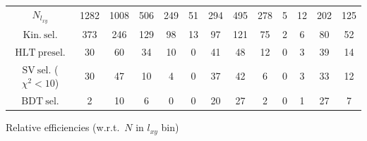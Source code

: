 \documentclass[10pt,a4paper]{article}
\begin{document}
\begin{landscape}
{\begin{tabular}{c|cccc|cccc|cccc}
\midrule
$N_{l_{xy}}$ & 1282 & 1008 & 506 & 249 & 51 & 294 & 495 & 278 & 5 & 12 & 202 & 125\\
$\mathrm{Kin.\ sel.}$ & 373 & 246 & 129 & 98 & 13 & 97 & 121 & 75 & 2 & 6 & 80 & 52\\
$\mathrm{HLT\ presel.}$ & 30 & 60 & 34 & 10 & 0 & 41 & 48 & 12 & 0 & 3 & 39 & 14\\
$\mathrm{SV\ sel.}$ ($\chi^2{<}10$) & 30 & 47 & 10 & 4 & 0 & 37 & 42 & 6 & 0 & 3 & 33 & 12\\
$\mathrm{BDT\ sel.}$ & 2 & 10 & 6 & 0 & 0 & 20 & 27 & 2 & 0 & 1 & 27 & 7\\
\bottomrule
\end{tabular}}

\vspace{18pt}

Relative efficiencies (w.r.t.\ $N$ in $l_{xy}$ bin)


\end{landscape}
\end{document}
